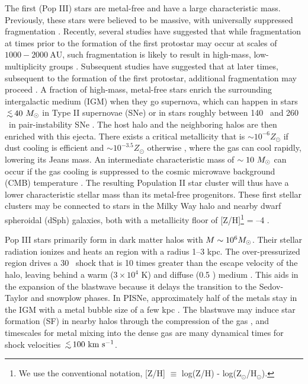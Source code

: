 \documentclass[apj]{emulateapj}
\begin{document}
The first (Pop III) stars are metal-free and have a large
characteristic mass.  Previously, these stars were believed to be
massive, with universally suppressed fragmentation \citep{ABN02,
Bromm02_P3, OShea07a}.  Recently, several studies have suggested that
while fragmentation at times prior to the formation of the first
protostar may occur at scales of $1000-2000~\mathrm{AU}$, such
fragmentation is likely to result in high-mass, low-multiplicity
groups \citep{2009Sci...325..601T, Stacy10_Binary}.  Subsequent
studies have suggested that at later times, subsequent to the
formation of the first protostar, additional fragmentation may proceed
\citep{Greif11_P3Cluster, Clark11_Frag}.  A fraction of high-mass,
metal-free stars enrich the surrounding intergalactic medium (IGM)
when they go supernova, which can happen in stars $\lsim 40~\Ms$ in
Type II supernovae (SNe) or in stars roughly between 140 \Ms~and 260
\Ms~in pair-instability SNe \citep[PISNe;][]{2002ApJ...567..532H}.
The host halo and the neighboring halos are then enriched with this
ejecta.  There exists a critical metallicity that is $\sim 10^{-6}
Z_\odot$ if dust cooling is efficient \citep{Omukai05,
Schneider06_Frag, clark08} and $\sim 10^{-3.5} Z_\odot$ otherwise
\citep{Bromm01, 2009ApJ...691..441S}, where the gas can cool rapidly,
lowering its Jeans mass.  An intermediate characteristic mass of
$\sim10~\Ms$ can occur if the gas cooling is suppressed to the cosmic
microwave background (CMB) temperature \citep{Larson98,
Tumlinson07_IMF, 2009ApJ...691..441S}.  The resulting Population II
star cluster will thus have a lower characteristic stellar mass than
its metal-free progenitors.  These first stellar clusters may be
connected to stars in the Milky Way halo and nearby dwarf spheroidal
(dSph) galaxies, both with a metallicity floor of [Z/H]\footnote{We
use the conventional notation, [Z/H] $\equiv$ log(Z/H) -
log(Z$_\odot$/H$_\odot$).} = --4 \citep{Beers05, Frebel10_Obs,
Tafelmeyer10}.

Pop III stars primarily form in dark matter halos with $M \sim 10^6
\Ms$.  Their stellar radiation ionizes and heats an  region
with a radius 1--3 kpc.  The over-pressurized  region drives
a 30 \kms~shock that is 10 times greater than the escape velocity of
the halo, leaving behind a warm ($3 \times 10^4$ K) and diffuse (0.5
\cubecm) medium \citep{Kitayama04, Whalen04, Abel07}.  This aids in
the expansion of the blastwave because it delays the transition to the
Sedov-Taylor and snowplow phases.  In PISNe, approximately half of the
metals stay in the IGM with a metal bubble size of a few kpc
\citep{Wise08_Gal, Greif10}.  The blastwave may induce star formation
(SF) in nearby halos through the compression of the gas
\citep{Ferrara98}, and timescales for metal mixing into the dense gas
are many dynamical times \citep{Cen08} for shock velocities
$\lsim100~\kms$.
\end{document}
